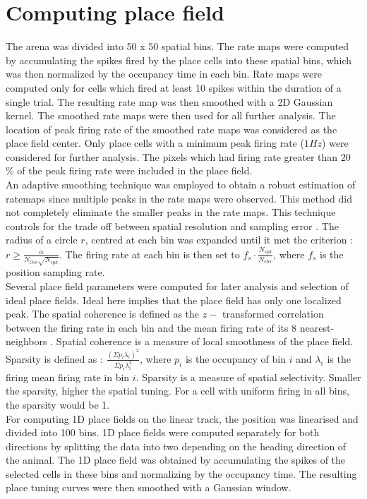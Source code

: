 \section{Computing place field}
\label{pfcompute}
The arena was divided into 50 x 50 spatial bins. The rate maps were computed by accumulating the spikes fired by the place cells into these spatial bins, which was then normalized by the occupancy time in each bin.
Rate maps were computed only for cells which fired at least 10 spikes within the duration of a single trial. The resulting rate map was then smoothed with a 2D Gaussian kernel. The smoothed rate maps were then used for all further analysis. The location of peak firing rate of the smoothed rate maps was considered as the place field center. Only place cells with a minimum peak firing rate ($1Hz$) were considered for further analysis. The pixels which had firing rate greater than 20 $\%$ of the peak firing rate were included in the place field.\\ 
An adaptive smoothing technique was employed to obtain a robust estimation of ratemaps since multiple peaks in the rate maps were observed. This method did not completely eliminate the smaller peaks in the rate maps. This technique controls for the trade off between spatial resolution and sampling error \cite{Skaggs1996c}. The radius of a circle $r$, centred at each bin was expanded until it met the criterion :   $ r \geq \frac{\alpha}{N_{Occ} \sqrt{N_{spk}}}$. The firing rate at each bin is then set to $f_{s} \cdot \frac{N_{spk}}{N_{Occ}}$, where $f_{s}$ is the position sampling rate.\\
Several place field parameters were computed for later analysis and selection of ideal place fields. Ideal here implies that the place field has only one localized peak. The spatial coherence is defined as the $z-$ transformed correlation between the firing rate in each bin and the mean firing rate of its 8 nearest-neighbors \cite{Muller1989}. Spatial coherence is a measure of local smoothness of the place field.\\
Sparsity is defined as : $\frac{(\Sigma p_{i} \lambda_{i})^{2}}{\Sigma p_{i} \lambda^{2}_{i}}$, where $p_{i}$ is the occupancy of bin $i$ and $\lambda_{i}$ is the firing mean firing rate in bin $i$. Sparsity is a measure of spatial selectivity. Smaller the sparsity, higher the spatial tuning. For a cell with uniform firing in all bins, the sparsity would be 1. \\

For computing 1D place fields on the linear track, the position was linearised and divided into 100 bins.
1D place fields were computed separately for both directions by splitting the data into two depending on the heading direction of the animal. The 1D place field was obtained by accumulating the spikes of the selected cells in these bins and normalizing by the occupancy  time. The resulting place tuning curves were then smoothed with a Gaussian window.\\

